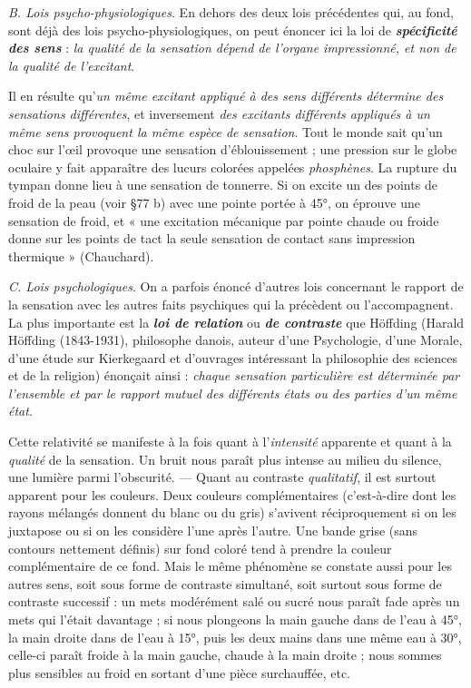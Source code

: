 {\it B. Lois psycho-physiologiques}. En dehors des deux lois précédentes
qui, au fond, sont déjà des lois psycho-physiologiques, on peut énoncer
ici la loi de \textbf{\textit {spécificité des sens}} : {\it la qualité de la sensation dépend
de l'organe impressionné, et non de la qualité de l’excitant}.

\vspace{0.24cm}
{\footnotesize 
Il en résulte qu'{\it un même excitant appliqué à des sens différents détermine
des sensations différentes}, et inversement {\it des excitants différents appliqués
à un même sens provoquent la même espèce de sensation}. Tout le monde sait
qu’un choc sur l’œil provoque une sensation d’éblouissement ; une pression
sur le globe oculaire y fait apparaître des lucurs colorées appelées {\it phosphènes}.
La rupture du tympan donne lieu à une sensation de tonnerre. Si
on excite un des points de froid de la peau (voir \S 77 b) avec une pointe
portée à 45°, on éprouve une sensation de froid, et « une excitation mécanique
par pointe chaude ou froide donne sur les points de tact la seule
sensation de contact sans impression thermique » (Chauchard).}
\vspace{0.31cm}

{\it C. Lois psychologiques}. On a parfois énoncé d’autres lois concernant
le rapport de la sensation avec les autres faits psychiques qui la
précèdent ou l’accompagnent. La plus importante est la \textbf{\textit {loi de
relation}} ou \textbf{\textit {de contraste}} que Höffding
{\scriptsize (Harald Höffding (1843-1931), philosophe danois, auteur d’une Psychologie, d'une
Morale, d’une étude sur Kierkegaard et d'ouvrages intéressant la philosophie des sciences
et de la religion)}
énonçait ainsi : {\it chaque
sensation particulière est déterminée par l’ensemble et par le rapport
mutuel des différents états ou des parties d’un même état}.

\vspace{0.24cm}
{\footnotesize 
Cette relativité se manifeste à la fois quant à l'{\it intensité} apparente et
quant à la {\it qualité} de la sensation. Un bruit nous paraît plus intense au milieu
du silence, une lumière parmi l’obscurité. — Quant au contraste {\it qualitatif}, il
est surtout apparent pour les couleurs. Deux couleurs complémentaires
(c’est-à-dire dont les rayons mélangés donnent du blanc ou du gris) s’avivent
réciproquement si on les juxtapose ou si on les considère l’une après l’autre. Une
bande grise (sans contours nettement définis) sur fond coloré tend à prendre
la couleur complémentaire de ce fond. Mais le même phénomène se constate
aussi pour les autres sens, soit sous forme de contraste simultané, soit
surtout sous forme de contraste successif : un mets modérément salé ou
sucré nous paraît fade après un mets qui l'était davantage ; si nous plongeons
la main gauche dans de l’eau à 45°, la main droite dans de l’eau à
15°, puis les deux mains dans une même eau à 30°, celle-ci paraît froide à
la main gauche, chaude à la main droite ; nous sommes plus sensibles au
froid en sortant d’une pièce surchauffée, etc.}
\vspace{0.31cm}

